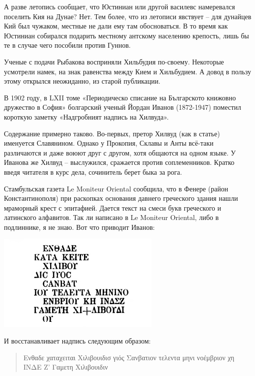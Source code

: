 А разве летопись сообщает, что Юстиниан или другой василевс намеревался поселить Кия на Дунае? Нет. Тем более, что из летописи явствует – для дунайцев Кий был чужаком, местные не дали ему там обосноваться. В то время как Юстиниан собирался подарить местному антскому населению крепость, лишь бы те в случае чего пособили против Гуннов.

Ученые с подачи Рыбакова восприняли Хильбудия по-своему. Некоторые усмотрели намек, на знак равенства между Кием и Хильбудием. А довод в пользу этому открылся неожиданно, из старой публикации.

В 1902 году, в LXII томе «Периодическо списание на Българското книжовно дружество в София» болгарский ученый Йордан Иванов (1872-1947) поместил короткую заметку «Надгробният надпись на Хилвуда».

Содержание примерно таково. Во-первых, претор Хилвуд (как в статье) именуется Славянином. Однако у Прокопия, Склавы и Анты всё-таки различаются и даже воюют друг с другом, хотя общаются на одном языке. У Иванова же Хилвуд – выслужился, сражается против соплеменников. Кратко введя читателя в курс дела, сочинитель берет быка за рога.

Стамбульская газета Le Moniteur Oriental сообщила, что в Фенере (район Константинополя) при раскопках основания давнего греческого здания нашли мраморный крест с эпитафией. Дается текст на смеси букв греческого и латинского алфавитов. Так ли написано в Le Moniteur Oriental, либо в подлиннике, я не знаю. Вот что приводит Иванов:

\begin{center}
\includegraphics[width=0.50\linewidth]{chast-colebanie-osnov/hilbudiy/hilep.png}
\end{center}

И восстанавливает надпись следующим образом: 
\begin{otherlanguage}{greek}
\begin{quotation}
Ενθαδε χαταχειται Χιλιβουιδισ γιός Σανβατιον τελεν\-τα  μηνι νοέμβριον χη INΔE Z' Γαμετη Χιλιβουι\-διν
\end{quotation}
\end{otherlanguage}


